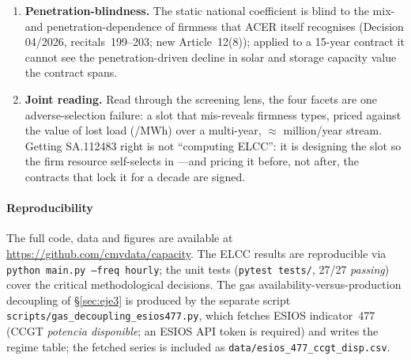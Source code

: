 \documentclass[11pt,a4paper]{article}
\begin{document}
\begin{enumerate}
      cleaner benchmark lands ---exactly where the investment signal lives--- while the
      gas distortion, sitting on annually re-set existing plant, is short-lived.
\item \textbf{Penetration-blindness.} The static national coefficient is blind to the
      mix- and penetration-dependence of firmness that ACER itself recognises (Decision
      04/2026, recitals~199--203; new Article~12(8)); applied to a 15-year contract it
      cannot see the penetration-driven decline in solar and storage capacity value the
      contract spans.
\item \textbf{Joint reading.} Read through the screening lens, the four facets are one
      adverse-selection failure: a slot that mis-reveals firmness types, priced against
      the value of lost load (/MWh) over a multi-year, $\approx$
      million/year stream. Getting SA.112483 right is not ``computing ELCC'': it is
      designing the slot so the firm resource self-selects in ---and pricing it before,
      not after, the contracts that lock it for a decade are signed.
\end{enumerate}

\paragraph{Reproducibility}
The full code, data and figures are available at
\url{https://github.com/cmvdata/capacity}. The ELCC results are reproducible via
\texttt{python main.py --freq hourly}; the unit tests (\texttt{pytest tests/},
27/27 \emph{passing}) cover the critical methodological decisions. The gas
availability-versus-production decoupling of \S\ref{sec:eje3} is produced by the
separate script \texttt{scripts/gas\_decoupling\_esios477.py}, which fetches ESIOS
indicator~477 (CCGT \emph{potencia disponible}; an ESIOS API token is required) and
writes the regime table; the fetched series is included as
\texttt{data/esios\_477\_ccgt\_disp.csv}.



\end{document}
